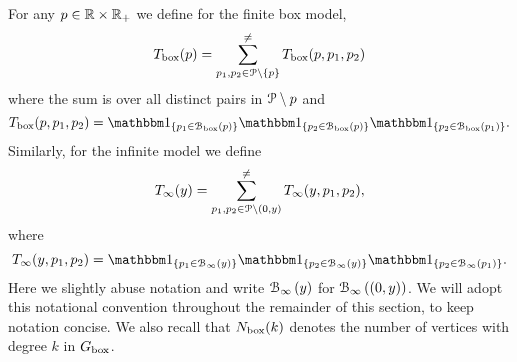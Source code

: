 %
%




For any $p \in {\ensuremath{\mathbb R}} \times {\ensuremath{\mathbb R}}_+$ we define for the finite box model,
\[
	T_{\text{box}}(p) = \sum^{\ne}_{p_1, p_2 \in {\mathcal P} \setminus \{p\}} T_{\text{box}}(p,p_1,p_2)
\]
where the sum is over all distinct pairs in ${\mathcal P} \setminus p$ and
\[
	T_{\text{box}}(p,p_1,p_2) = \ind{p_1 \in \BallPon{p}}\ind{p_2 \in \BallPon{p}}\ind{p_2 \in \BallPon{p_1}}.
\]
Similarly, for the infinite model we define
\[
	T_\infty(y) = \sum_{p_1, p_2 \in {\mathcal P} \setminus (0,y)}^{\ne} T_\infty(y,p_1,p_2),
\]
where
\[
	T_{\infty}(y,p_1,p_2) = \ind{p_1 \in \BallPo{y}}\ind{p_2 \in \BallPo{y}}\ind{p_2 \in \BallPo{p_1}}.
\]
Here we slightly abuse notation and write ${\mathcal B}_{\infty}\left(y\right)$ for ${\mathcal B}_{\infty}\left((0,y)\right)$. We will adopt this notational convention throughout the remainder of this section, to keep notation concise. We also recall that $N_{\text{box}}(k)$ denotes the number of vertices with degree $k$ in $G_{\mathrm{box}}$.

